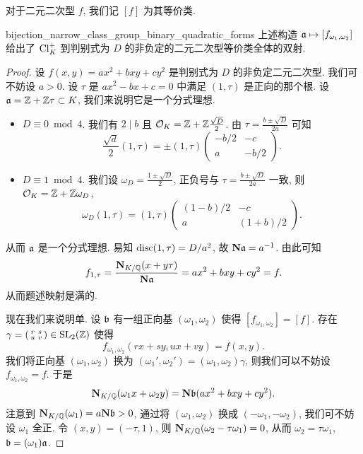 对于二元二次型 $f$, 我们记 $[f]$ 为其等价类.
\begin{theorem}{}{bijection_narrow_class_group_binary_quadratic_forms}
上述构造 ${\mathfrak{a}}\mapsto [f_{\omega_1,\omega_2}]$ 给出了 ${\mathrm{Cl}}_K^+$ 到判别式为 $D$ 的非负定的二元二次型等价类全体的双射.
\end{theorem}
\begin{proof}
设 $f(x,y)=ax^2+bxy+cy^2$ 是判别式为 $D$ 的非负定二元二次型. 我们可不妨设 $a>0$. 设 $\tau$ 是 $ax^2-bx+c=0$ 中满足 $(1,\tau)$ 是正向的那个根. 设 ${\mathfrak{a}}={\mathbb{Z}}+{\mathbb{Z}}\tau\subset K$, 我们来说明它是一个分式理想.
\begin{itemize}
\item $D\equiv 0\bmod 4$. 我们有 $2\mid b$ 且 ${\mathcal{O}}_K={\mathbb{Z}}+{\mathbb{Z}}\frac{\sqrt{D}}{2}$. 由 $\tau=\frac {b\pm\sqrt{D}}{2a}$ 可知
	\[\frac{\sqrt{d}}{2}(1,\tau)=\pm(1,\tau)\left(\begin{smallmatrix}
	-b/2&-c\\a&-b/2\end{smallmatrix}\right).\]
\item $D\equiv 1\bmod 4$. 我们设 $\omega_D=\frac{1\pm\sqrt{D}}{2}$, 正负号与 $\tau=\frac {b\pm\sqrt{D}}{2a}$ 一致, 则 ${\mathcal{O}}_K={\mathbb{Z}}+{\mathbb{Z}}\omega_D$,
	\[\omega_D(1,\tau)=(1,\tau)\left(\begin{smallmatrix}
	(1-b)/2&-c\\a&(1+b)/2\end{smallmatrix}\right).\]
\end{itemize}
从而 ${\mathfrak{a}}$ 是一个分式理想.
易知 ${\mathrm{disc}}(1,\tau)=D/a^2$, 故 ${\mathbf{N}}{\mathfrak{a}}=a^{-1}$. 由此可知
	\[f_{1,\tau}=\frac{{\mathbf{N}}_{K/{\mathbb{Q}}}(x+y\tau)}{{\mathbf{N}}{\mathfrak{a}}}=ax^2+bxy+cy^2=f.\]
从而题述映射是满的.

现在我们来说明单. 设 ${\mathfrak{b}}$ 有一组正向基 $(\omega_1,\omega_2)$ 使得 $[f_{\omega_1,\omega_2}]=[f]$. 存在 $\gamma=\left(\begin{smallmatrix}
r&s\\ u&v\end{smallmatrix}\right)\in{\mathrm{SL}}_2({\mathbb{Z}})$ 使得
	\[f_{\omega_1,\omega_2}(rx+sy,ux+vy)=f(x,y).\]
我们将正向基 $(\omega_1,\omega_2)$ 换为 $(\omega_1',\omega_2')=(\omega_1,\omega_2)\gamma$, 则我们可以不妨设 $f_{\omega_1,\omega_2}=f$. 于是
	\[{\mathbf{N}}_{K/{\mathbb{Q}}}(\omega_1 x+\omega_2y)={\mathbf{N}}{\mathfrak{b}}(ax^2+bxy+cy^2).\]
注意到 ${\mathbf{N}}_{K/{\mathbb{Q}}}(\omega_1)=a{\mathbf{N}}{\mathfrak{b}}>0$, 通过将 $(\omega_1,\omega_2)$ 换成 $(-\omega_1,-\omega_2)$, 我们可不妨设 $\omega_1$ 全正. 令 $(x,y)=(-\tau,1)$, 则 ${\mathbf{N}}_{K/{\mathbb{Q}}}(\omega_2-\tau \omega_1)=0$, 从而 $\omega_2=\tau\omega_1$, ${\mathfrak{b}}=(\omega_1){\mathfrak{a}}$.
\end{proof}

